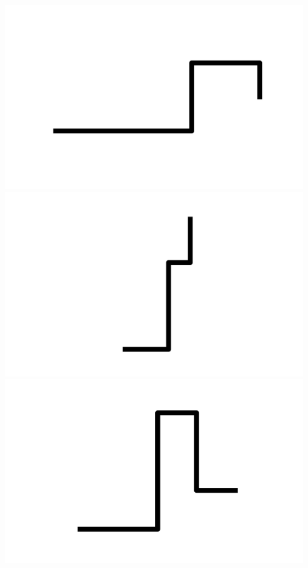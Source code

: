 \documentclass[]{report}
\begin{document}
\includegraphics[scale=.1]{pictures/21/state_cluster_shapes_58.pdf} 
\includegraphics[scale=.1]{pictures/21/state_cluster_shapes_59.pdf} 
\includegraphics[scale=.1]{pictures/21/state_cluster_shapes_60.pdf} 
\end{document}

